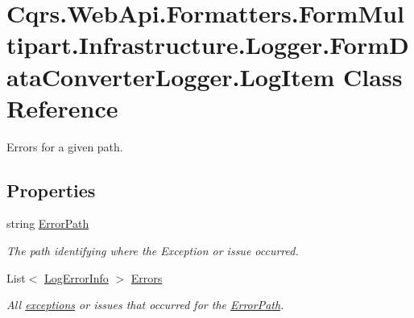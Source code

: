 \hypertarget{classCqrs_1_1WebApi_1_1Formatters_1_1FormMultipart_1_1Infrastructure_1_1Logger_1_1FormDataConverterLogger_1_1LogItem}{}\section{Cqrs.\+Web\+Api.\+Formatters.\+Form\+Multipart.\+Infrastructure.\+Logger.\+Form\+Data\+Converter\+Logger.\+Log\+Item Class Reference}
\label{classCqrs_1_1WebApi_1_1Formatters_1_1FormMultipart_1_1Infrastructure_1_1Logger_1_1FormDataConverterLogger_1_1LogItem}


Errors for a given path.  


\subsection*{Properties}
\begin{DoxyCompactItemize}
\item 
string \hyperlink{classCqrs_1_1WebApi_1_1Formatters_1_1FormMultipart_1_1Infrastructure_1_1Logger_1_1FormDataConverterLogger_1_1LogItem_a300199a6b543a7a53b81b18aeb10652b_a300199a6b543a7a53b81b18aeb10652b}{Error\+Path}
\begin{DoxyCompactList}\small\item\em The path identifying where the Exception or issue occurred. \end{DoxyCompactList}\item 
List$<$ \hyperlink{classCqrs_1_1WebApi_1_1Formatters_1_1FormMultipart_1_1Infrastructure_1_1Logger_1_1FormDataConverterLogger_1_1LogErrorInfo}{Log\+Error\+Info} $>$ \hyperlink{classCqrs_1_1WebApi_1_1Formatters_1_1FormMultipart_1_1Infrastructure_1_1Logger_1_1FormDataConverterLogger_1_1LogItem_ae02eb8b73e2614a9f24eb87bfaa6c23f_ae02eb8b73e2614a9f24eb87bfaa6c23f}{Errors}
\begin{DoxyCompactList}\small\item\em All \hyperlink{}{exceptions} or issues that occurred for the \hyperlink{classCqrs_1_1WebApi_1_1Formatters_1_1FormMultipart_1_1Infrastructure_1_1Logger_1_1FormDataConverterLogger_1_1LogItem_a300199a6b543a7a53b81b18aeb10652b_a300199a6b543a7a53b81b18aeb10652b}{Error\+Path}. \end{DoxyCompactList}\end{DoxyCompactItemize}


